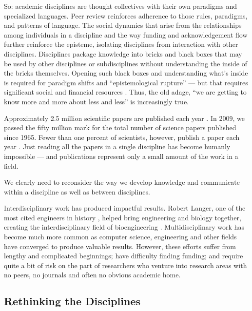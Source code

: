 So: academic disciplines are thought collectives with their own paradigms and specialized languages. Peer review reinforces adherence to those rules, paradigms, and patterns of language. The social dynamics that arise from the relationships among individuals in a discipline and the way funding and acknowledgement flow further reinforce the episteme, isolating disciplines from interaction with other disciplines. Disciplines package knowledge into bricks and black boxes \cite{latour_pandoras_1999} that may be used by other disciplines or subdisciplines without understanding the inside of the bricks themselves. Opening such black boxes and understanding what's inside is required for paradigm shifts and ``epistemological rupture'' \cite{bachelard_formation_2002} --- but that requires significant social and financial resources \cite{latour_science_1987}. Thus, the old adage, ``we are getting to know more and more about less and less'' \cite{fowler1911religious} is increasingly true. 

Approximately 2.5 million scientific papers are published each year \cite{jinha_article_2010}. In 2009, we passed the fifty million mark for the total number of science papers published since 1965. Fewer than one percent of scientists, however, publish a paper each year \cite{stokstad20141}. Just reading all the papers in a single discipline has become humanly impossible --- and publications represent only a small amount of the work in a field.

We clearly need to reconsider the way we develop knowledge and communicate within a discipline as well as between disciplines.

Interdisciplinary work has produced impactful results. Robert Langer, one of the most cited engineers in history \cite{noauthor_2610_2018}, helped bring engineering and biology together, creating the interdisciplinary field of bioengineering \cite{noauthor_struggles_2012, pearson_profile:_2009}. Multidisciplinary work has become much more common as computer science, engineering and other fields have converged to produce valuable results. However, these efforts suffer from lengthy and complicated beginnings; have difficulty finding funding; and require quite a bit of risk on the part of researchers who venture into research areas with no peers, no journals and often no obvious academic home.

\subsection{Rethinking the Disciplines}
\label{chap3:antidisciplinary}

